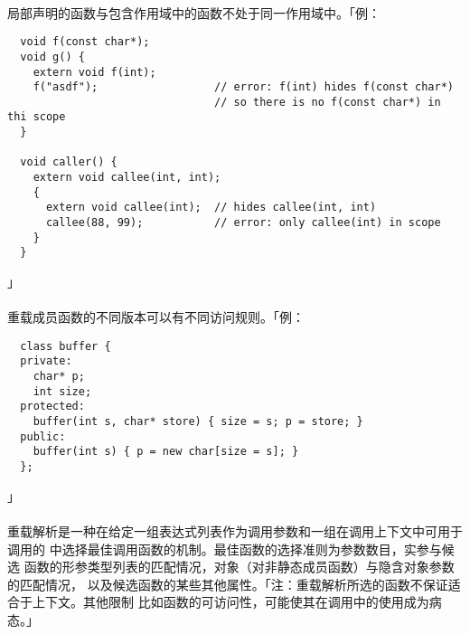 \paragraph{}
局部声明的函数与包含作用域中的函数不处于同一作用域中。「例：
\begin{lstlisting}
  void f(const char*);
  void g() {
    extern void f(int);
    f("asdf");                  // error: f(int) hides f(const char*)
                                // so there is no f(const char*) in thi scope
  }

  void caller() {
    extern void callee(int, int);
    {
      extern void callee(int);  // hides callee(int, int)
      callee(88, 99);           // error: only callee(int) in scope
    }
  }
\end{lstlisting}」

\paragraph{}
重载成员函数的不同版本可以有不同访问规则。「例：
\begin{lstlisting}
  class buffer {
  private:
    char* p;
    int size;
  protected:
    buffer(int s, char* store) { size = s; p = store; }
  public:
    buffer(int s) { p = new char[size = s]; }
  };
\end{lstlisting}」

\paragraph{}
重载解析是一种在给定一组表达式列表作为调用参数和一组在调用上下文中可用于调用的
中选择最佳调用函数的机制。最佳函数的选择准则为参数数目，实参与候选
函数的形参类型列表的匹配情况，对象（对非静态成员函数）与隐含对象参数的匹配情况，
以及候选函数的某些其他属性。「注：重载解析所选的函数不保证适合于上下文。其他限制
比如函数的可访问性，可能使其在调用中的使用成为病态。」

